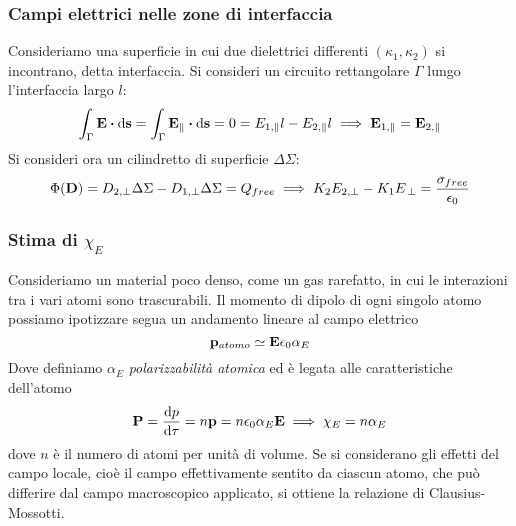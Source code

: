\documentclass[12pt,a4paper]{article}
\begin{document}
\subsubsection{Campi elettrici nelle zone di interfaccia}
Consideriamo una superficie in cui due dielettrici differenti $(\kappa_1, \kappa_2)$ si incontrano, detta interfaccia. 
Si consideri un circuito rettangolare $\Gamma$ lungo l'interfaccia largo $l$:
\begin{equation*}
    \int_\Gamma \vb{E}\vdot\dd{\vb{s}}= \int_\Gamma \vb{E}_\parallel\vdot\dd{\vb{s}}= 0 = E_{1,\parallel}l-E_{2,\parallel}l \implies \vb{E}_{1,\parallel}= \vb{E}_{2,\parallel}
\end{equation*}
Si consideri ora un cilindretto di superficie $\Delta\Sigma$:
\begin{equation*}
    \Phi(\vb{D})= D_{2,\perp}\Delta\Sigma-D_{1,\perp}\Delta\Sigma = Q_{free}\implies K_2E_{2,\perp} -K_1E_{\,\perp}= \frac{\sigma_{free}}{\epsilon_0}
\end{equation*}

\subsubsection[Stima di chi]{Stima di $\chi_E$}
Consideriamo un material poco denso, come un gas rarefatto, in cui le interazioni tra i vari atomi sono trascurabili. 
Il momento di dipolo di ogni singolo atomo possiamo ipotizzare segua un andamento lineare al campo elettrico
\begin{equation*}
    \vb{p}_{atomo}\simeq\vb{E}\epsilon_0\alpha_E
\end{equation*}
Dove definiamo $\alpha_E$ \textit{polarizzabilità atomica} ed è legata alle caratteristiche dell'atomo
\begin{equation*}
    \vb{P}= \frac{\dd{p}}{\dd{\tau}}= n\vb{p}= n\epsilon_0\alpha_E\vb{E}\implies \chi_E = n\alpha_E 
\end{equation*}
dove $n$ è il numero di atomi per unità di volume.
Se si considerano gli effetti del campo locale, cioè il campo effettivamente sentito da ciascun atomo, che può differire dal campo macroscopico applicato, si ottiene la relazione di Clausius-Mossotti.
\end{document}
